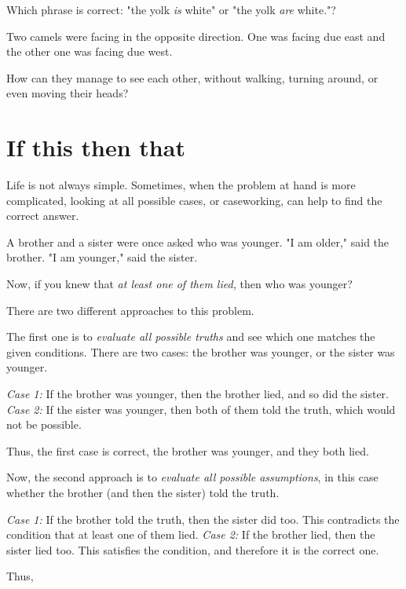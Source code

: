 \documentclass{article}
\begin{document}
\begin{exercise*}
    \label{exercise:pi-2022-4-p5}
    Which phrase is correct: "the yolk \textit{is} white" or "the yolk \textit{are} white."?
\end{exercise*}

\begin{exercise*}
    \label{exercise:pi-2022-4-p6}
    Two camels were facing in the opposite direction.
    One was facing due east and the other one was facing due west.

    How can they manage to see each other, without walking, turning around, or even moving their heads?
\end{exercise*}

\section*{If this then that}

Life is not always simple. Sometimes, when the problem at hand is more complicated, 
looking at all possible cases, or caseworking, can help to find the correct answer.

\begin{example*}
    \label{example:pi-2022-4-p7}
    A brother and a sister were once asked who was younger. "I am older," said the brother.
    "I am younger," said the sister.

    Now, if you knew that \textit{at least one of them lied,}
    then who was younger?
\end{example*}

\begin{soln}
    There are two different approaches to this problem.

    The first one is to \textit{evaluate all possible truths} and see which one matches the given conditions.
    There are two cases: the brother was younger, or the sister was younger.  
    \begin{itemize}[topsep=0pt, partopsep=0pt, itemsep=0pt]
        \ii \textit{Case 1:} If the brother was younger, then the brother lied, and so did the sister.
        \ii \textit{Case 2:} If the sister was younger, then both of them told the truth, which would not be possible.
    \end{itemize}    
    Thus, the first case is correct, the brother was younger, and they both lied.
    
    Now, the second approach is to \textit{evaluate all possible assumptions},
    in this case whether the brother (and then the sister) told the truth.
    \begin{itemize}[topsep=0pt, partopsep=0pt, itemsep=0pt]
        \ii \textit{Case 1:} If the brother told the truth, then the sister did too.
        This contradicts the condition that at least one of them lied.
        \ii \textit{Case 2:} If the brother lied, then the sister lied too.
        This satisfies the condition, and therefore it is the correct one.
    \end{itemize}    

    Thus, 
\end{soln}
\end{document}

